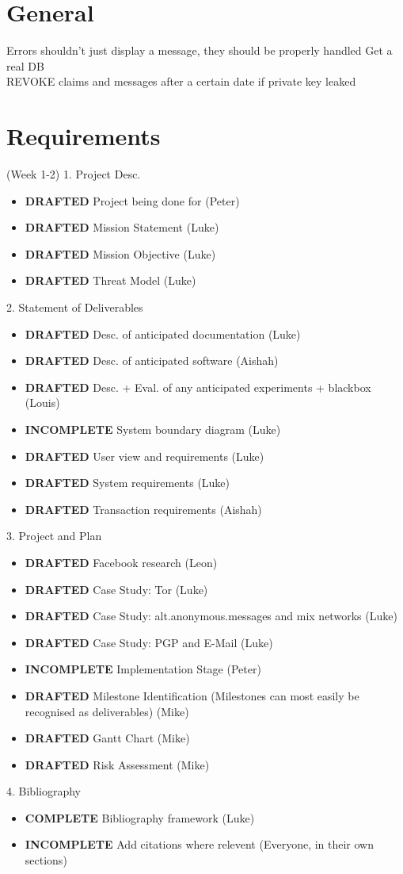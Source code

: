 \section{General}
Errors shouldn't just display a message, they should be properly handled
Get a real DB\\
REVOKE claims and messages after a certain date if private key leaked\\

\section{Requirements} (Week 1-2)
1. Project Desc.
\begin{itemize}
\item \textbf{DRAFTED} Project being done for (Peter)
\item \textbf{DRAFTED} Mission Statement (Luke)
\item \textbf{DRAFTED} Mission Objective (Luke)
\item \textbf{DRAFTED} Threat Model (Luke)
\end{itemize}

2. Statement of Deliverables
\begin{itemize}
\item \textbf{DRAFTED}    Desc. of anticipated documentation (Luke)
\item \textbf{DRAFTED}    Desc. of anticipated software (Aishah)
\item \textbf{DRAFTED}    Desc. + Eval. of any anticipated experiments + blackbox (Louis)
\item \textbf{INCOMPLETE} System boundary diagram (Luke)
\item \textbf{DRAFTED}    User view and requirements (Luke)
\item \textbf{DRAFTED}    System requirements (Luke)
\item \textbf{DRAFTED}    Transaction requirements (Aishah)
\end{itemize}

3. Project and Plan
\begin{itemize}
\item \textbf{DRAFTED}     Facebook research (Leon)
\item \textbf{DRAFTED}     Case Study: Tor (Luke)
\item \textbf{DRAFTED}     Case Study: alt.anonymous.messages and mix networks (Luke)
\item \textbf{DRAFTED}     Case Study: PGP and E-Mail (Luke)
\item \textbf{INCOMPLETE}  Implementation Stage (Peter)
\item \textbf{DRAFTED}     Milestone Identification (Milestones can most easily be recognised as deliverables) (Mike)
\item \textbf{DRAFTED}     Gantt Chart (Mike)
\item \textbf{DRAFTED}     Risk Assessment (Mike)
\end{itemize}

4. Bibliography
\begin{itemize}
\item \textbf{COMPLETE}   Bibliography framework (Luke)
\item \textbf{INCOMPLETE} Add citations where relevent (Everyone, in their own sections)
\end{itemize}
